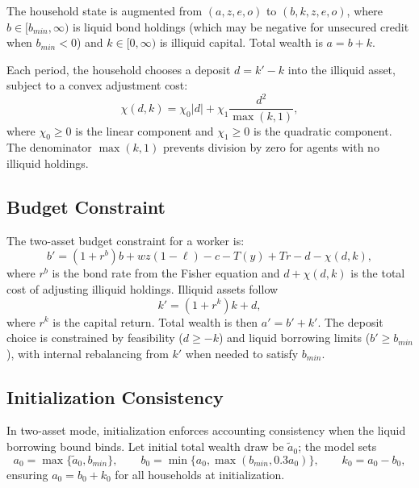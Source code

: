 \documentclass[12pt]{article}
\begin{document}
The household state is augmented from $(a, z, e, o)$ to $(b, k, z, e, o)$, where $b \in [b_{min}, \infty)$ is liquid bond holdings (which may be negative for unsecured credit when $b_{min} < 0$) and $k \in [0, \infty)$ is illiquid capital. Total wealth is $a = b + k$.

Each period, the household chooses a deposit $d = k' - k$ into the illiquid asset, subject to a convex adjustment cost:
\begin{equation}\label{eq:adj_cost}
  \chi(d, k) = \chi_0 |d| + \chi_1 \frac{d^2}{\max(k, 1)},
\end{equation}
where $\chi_0 \geq 0$ is the linear component and $\chi_1 \geq 0$ is the quadratic component. The denominator $\max(k, 1)$ prevents division by zero for agents with no illiquid holdings.

\subsection{Budget Constraint}

The two-asset budget constraint for a worker is:
\begin{equation}\label{eq:two_asset_budget}
  b' = (1 + r^b) b + wz(1-\ell) - c - T(y) + Tr - d - \chi(d, k),
\end{equation}
where $r^b$ is the bond rate from the Fisher equation and $d + \chi(d, k)$ is the total cost of adjusting illiquid holdings.
Illiquid assets follow
\begin{equation}\label{eq:two_asset_illiquid}
  k' = (1 + r^k) k + d,
\end{equation}
where $r^k$ is the capital return. Total wealth is then $a' = b' + k'$.
The deposit choice is constrained by feasibility ($d \geq -k$) and liquid borrowing limits ($b' \geq b_{min}$), with internal rebalancing from $k'$ when needed to satisfy $b_{min}$.

\subsection{Initialization Consistency}

In two-asset mode, initialization enforces accounting consistency when the liquid borrowing bound binds. Let initial total wealth draw be $\tilde{a}_0$; the model sets
\begin{equation}\label{eq:two_asset_init}
  a_0 = \max\{\tilde{a}_0, b_{min}\}, \qquad
  b_0 = \min\{a_0, \max(b_{min}, 0.3a_0)\}, \qquad
  k_0 = a_0 - b_0,
\end{equation}
ensuring $a_0 = b_0 + k_0$ for all households at initialization.
\end{document}
